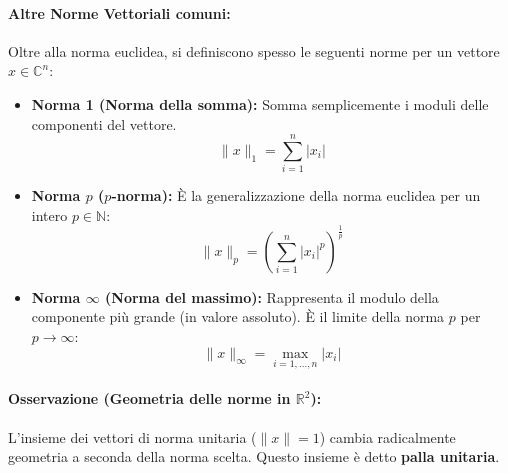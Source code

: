 \documentclass[a4paper,12pt]{article}
\begin{document}
	\paragraph{Altre Norme Vettoriali comuni:}
	Oltre alla norma euclidea, si definiscono spesso le seguenti norme per un vettore $x \in \mathbb{C}^n$:
	
	\begin{itemize}
		\item \textbf{Norma 1 (Norma della somma):} 
		Somma semplicemente i moduli delle componenti del vettore.
		\begin{equation}
			\|x\|_1 = \sum_{i=1}^{n} |x_i|
		\end{equation}
		
		\item \textbf{Norma $p$ ($p$-norma):} 
		È la generalizzazione della norma euclidea per un intero $p \in \mathbb{N}$:
		\begin{equation}
			\|x\|_p = \left( \sum_{i=1}^{n} |x_i|^p \right)^{\frac{1}{p}}
		\end{equation}
		
		\item \textbf{Norma $\infty$ (Norma del massimo):} 
		Rappresenta il modulo della componente più grande (in valore assoluto). È il limite della norma $p$ per $p \to \infty$:
		\begin{equation}
			\|x\|_\infty = \max_{i=1, \dots, n} |x_i|
		\end{equation}
	\end{itemize}
	\paragraph{Osservazione (Geometria delle norme in $\mathbb{R}^2$):} 
	L'insieme dei vettori di norma unitaria ($\|x\| = 1$) cambia radicalmente geometria a seconda della norma scelta. Questo insieme è detto \textbf{palla unitaria}.
	
\end{document}
